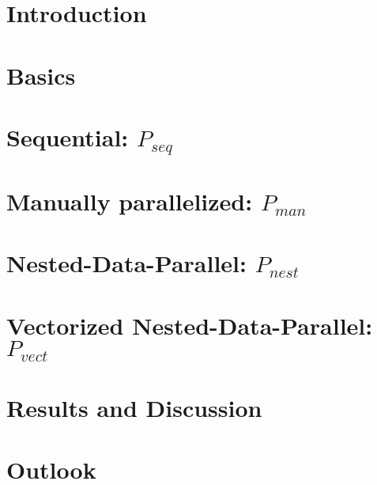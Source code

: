 \documentclass[draft=false
              ,paper=a4
              ,twoside=false
              ,fontsize=11pt
              ,headsepline
              ,BCOR10mm
              ,DIV11
              ]{scrbook}
\newcommand{\seq}[0]{$P_{seq}$\xspace}
\newcommand{\man}[0]{$P_{man}$\xspace}
\newcommand{\ndpn}[0]{$P_{nest}$\xspace}
\newcommand{\ndpv}[0]{$P_{vect}$\xspace}
\begin{document}
\newpage
\singlespacing

\tableofcontents
\newpage
\listoftables
\listoffigures

\mainmatter
\onehalfspacing

\chapter{Introduction}
  

\chapter{Basics}
  \label{chapter:basics}
  
  
\chapter{Sequential: \seq}
  \label{chapter:seq}
  
  
\chapter{Manually parallelized: \man}
  \label{chapter:man}
  

\chapter{Nested-Data-Parallel: \ndpn}
  \label{chapter:ndpn}
  

\chapter{Vectorized Nested-Data-Parallel: \ndpv}
  \label{chapter:ndpv}
  

\chapter{Results and Discussion}
  \label{chapter:results}
  

\chapter{Outlook}
  \label{chapter:outlook}
  
\end{document}
